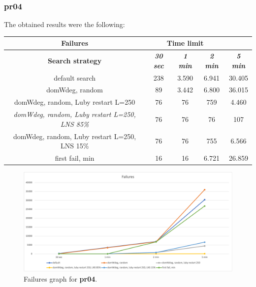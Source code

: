 \subsubsection{pr04}
\label{subsubsec:pr04}
The obtained results were the following:
{
\renewcommand{\arraystretch}{2}
\begin{longtable}[h]{| c | c | c | c | c |}
    \hline
    \textbf{Failures} & \multicolumn{3}{c}{\textbf{Time limit}} & \\
    \hline
    \textbf{Search strategy} & \textbf{\textit{30 sec}} & \textbf{\textit{1 min}} & \textbf{\textit{2 min}} & \textbf{\textit{5 min}} \\
    \hline
    \endhead
    default search                                         & 238 &  3.590 &  6.941 &  30.405 \\
    \hline
    domWdeg, random                                        &  89 &  3.442 &  6.800 &  36.015 \\
    \hline
    domWdeg, random, Luby restart L=250                    &  76 &    76 &   759 &   4.460 \\
    \hline
    \textit{domWdeg, random, Luby restart L=250, LNS 85\%} &  76 &    76 &    76 &    107 \\
    \hline
    domWdeg, random, Luby restart L=250, LNS 15\%          &  76 &    76 &   755 &   6.566 \\
    \hline
    first fail, min                                        &  16 &    16 &  6.721 &  26.859 \\
    \hline
\end{longtable}
}
\begin{figure}[H]
    \centering
    \includegraphics[width=0.8\columnwidth]{../graphs/pr04-failures.png}
    \caption{Failures graph for \textbf{pr04}.}
\end{figure}

